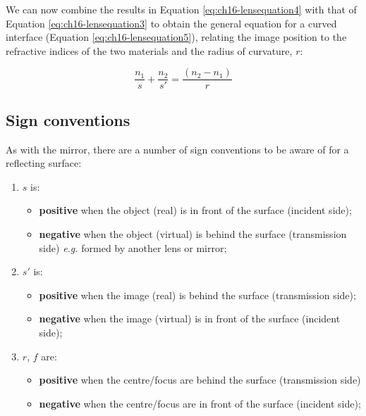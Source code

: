 \documentclass[
]{book}
\providecommand{\tightlist}{%
  \setlength{\itemsep}{0pt}\setlength{\parskip}{0pt}}
\begin{document}
We can now combine the results in Equation \eqref{eq:ch16-lensequation4} with that of Equation \eqref{eq:ch16-lensequation3} to obtain the general equation for a curved interface (Equation \eqref{eq:ch16-lensequation5}), relating the image position to the refractive indices of the two materials and the radius of curvature, \(r\):

\begin{equation}
\frac{n_1}{s} + \frac{n_2}{s'} = \frac{(n_2 - n_1)}{r}
\label{eq:ch16-lensequation5}
\end{equation}

\hypertarget{sec:ch16-signconventioncurvedsurface1}{%
\subsection{Sign conventions}\label{sec:ch16-signconventioncurvedsurface1}}

As with the mirror, there are a number of sign conventions to be aware of for a reflecting surface:

\begin{enumerate}
\def\labelenumi{\arabic{enumi}.}
\tightlist
\item
  \(s\) is:

  \begin{itemize}
  \tightlist
  \item
    \textbf{positive} when the object (real) is in front of the surface (incident side);
  \item
    \textbf{negative} when the object (virtual) is behind the surface (transmission side) \emph{e.g.} formed by another lens or mirror;
  \end{itemize}
\item
  \(s'\) is:

  \begin{itemize}
  \tightlist
  \item
    \textbf{positive} when the image (real) is behind the surface (transmission side);
  \item
    \textbf{negative} when the image (virtual) is in front of the surface (incident side);
  \end{itemize}
\item
  \(r\), \(f\) are:

  \begin{itemize}
  \tightlist
  \item
    \textbf{positive} when the centre/focus are behind the surface (transmission side)
  \item
    \textbf{negative} when the centre/focus are in front of the surface (incident side);
  \end{itemize}
\end{enumerate}
\end{document}
